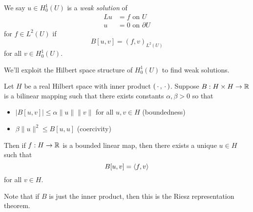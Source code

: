 \documentclass[a4paper]{article}
\begin{document}
\begin{defi}
  We say $u \in H_0^1(U)$ is a \emph{weak solution} of
  \begin{align*}
    Lu &= f \text{ on }U\\
    u &= 0\text{ on }\partial U
  \end{align*}
  for $f \in L^2(U)$ if
  \[
    B[u, v] = (f, v)_{L^2(U)}
  \]
  for all $v \in H_0^1(U)$.
\end{defi}

We'll exploit the Hilbert space structure of $H_0^1(U)$ to find weak solutions.

\begin{thm}
  Let $H$ be a real Hilbert space with inner product $(\,\cdot\,, \,\cdot\,)$. Suppose $B: H \times H \to \mathbb{R}$ is a bilinear mapping such that there exists constants $\alpha, \beta > 0$ so that
  \begin{itemize}
    \item $|B[u, v]| \leq \alpha \|u\| \|v\|$ for all $u, v \in H$ \hfill (boundedness)
    \item $\beta\|u\|^2 \leq B[u, u]$ \hfill (coercivity)
  \end{itemize}
  Then if $f: H \to \mathbb{R}$ is a bounded linear map, then there exists a unique $u \in H$ such that
  \[
    B[u, v] = \langle f, v\rangle
  \]
  for all $v \in H$.
\end{thm}
Note that if $B$ is just the inner product, then this is the Riesz representation theorem.
\end{document}
